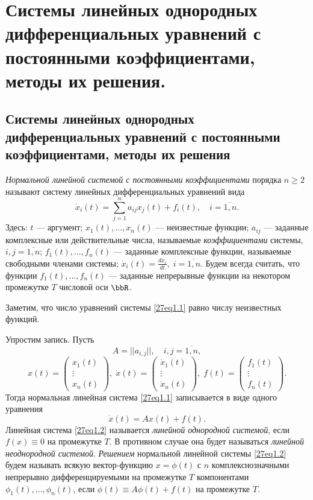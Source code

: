 \chapter{Системы линейных однородных дифференциальных уравнений с постоянными коэффициентами, методы их решения.}
\section{Системы линейных однородных дифференциальных уравнений с постоянными коэффициентами, методы их решения}
\begin{defn}\label{ch27defn1}
\textit{Нормальной линейной системой с постоянными коэффициентами} порядка $n\geq 2$ называют систему линейных дифференциальных уравнений вида
\begin{equation}\label{27eq1.1}
\dot x_i(t)=\sum\limits_{j=1}^n a_{ij}x_j(t)+f_i(t),\quad i=\overline{1,n}.
\end{equation}
Здесь: $t$ --- аргумент; $x_1(t),...,x_n(t)$ --- неизвестные функции; $a_{ij}$ --- заданные комплексные или действительные числа, называемые \textit{коэффициентами} системы, $i,j=\overline{1,n}$; $f_1(t),...,f_n(t)$ --- заданные комплексные функции, называемые свободными членами системы; $\dot x_i(t)=\frac{dx_i}{dt},\; i=\overline{1,n}$. Будем всегда считать, что функции $f_1(t),...,f_n(t)$ --- заданные непрерывные функции на некотором промежутке $T$ числовой оси $\bbR$.
\end{defn}
Заметим, что число уравнений системы \eqref{27eq1.1} равно числу неизвестных функций.

Упростим запись. Пусть
$$
A=||a_{i,j}||,\quad i,j=\overline{1,n},
$$
$$
x(t)=\begin{pmatrix}
x_1(t)\\ \vdots \\ x_n(t)
\end{pmatrix},\;
\dot x(t)=\begin{pmatrix}
\dot x_1(t)\\ \vdots \\ \dot x_n(t)
\end{pmatrix},\;
f(t)=\begin{pmatrix}
f_1(t)\\ \vdots \\ f_n(t)
\end{pmatrix}.
$$
Тогда нормальная линейная система \eqref{27eq1.1} записывается в виде одного уравнения 
\begin{equation} \label{27eq1.2}
\dot x(t)=Ax(t)+f(t).
\end{equation}
Линейная система \eqref{27eq1.2} называется \textit{линейной однородной системой}, если $f(x)\equiv 0$ на промежутке $T$. В противном случае она будет называться \textit{линейной неоднородной системой}. \textit{Решением} нормальной линейной системы \eqref{27eq1.2} будем называть всякую вектор-функцию  $x=\phi(t)$ с $n$ комплекснозначными непрерывно дифференцируемыми на промежутке $T$ компонентами $\phi_1(t),...,\phi_n(t)$, если $\dot \phi(t)\equiv A\phi(t)+f(t)$ на промежутке $T$.

